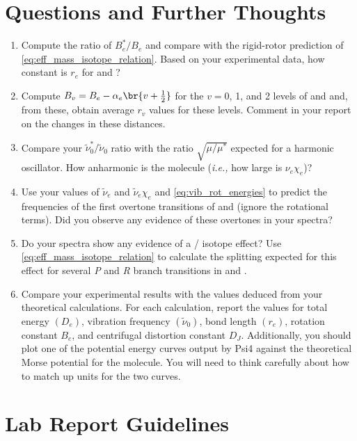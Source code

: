 \section{Questions and Further Thoughts} %
\label{sec:questions_and_further_thoughts}

\begin{enumerate}
	\item Compute the ratio of \( B_e^*/B_e \) and compare with the rigid-rotor prediction of \cref{eq:eff_mass_isotope_relation}. 
	Based on your experimental data, how constant is \( r_e \) for  and ?
	\item Compute \( B_v = B_e - \alpha_e\br{v + \tfrac{1}{2}} \) for the \( v = 0 \), \num{1}, and \num{2} levels of  and  and, from these, obtain average \( r_v \) values for these levels. 
	Comment in your report on the changes in these distances. 
	\item Compare your \( \widetilde{\nu}_0^*/\widetilde{\nu}_0 \) ratio with the ratio \( \sqrt{\mu/\mu^*} \) expected for a harmonic oscillator. How anharmonic is the  molecule (\emph{i.e.,} how large is \( \nu_e\chi_e \))?
	\item Use your values of \( \widetilde{\nu}_e \) and \( \widetilde{\nu}_e \chi_e \) and \cref{eq:vib_rot_energies} to predict the frequencies of the first overtone transitions of  and  (ignore the rotational terms). 
	Did you observe any evidence of these overtones in your spectra? 
	\item Do your spectra show any evidence of a / isotope effect? 
	Use \cref{eq:eff_mass_isotope_relation} to calculate the splitting expected for this effect for several \emph{P} and \emph{R} branch transitions in  and . 
	\item Compare your experimental results with the values deduced from your theoretical calculations. 
	For each calculation, report the values for total energy \( (D_e) \), vibration frequency \( (\widetilde{\nu}_0) \), bond length \( (r_e) \), rotation constant \( B_e \), and centrifugal distortion constant \( D_J \). 
	Additionally, you should plot one of the potential energy curves output by Psi4 against the theoretical Morse potential for the molecule. You will need to think carefully about how to match up units for the two curves. 
\end{enumerate}


\section{Lab Report Guidelines} %
\label{sec:lab_report_guidelines}

